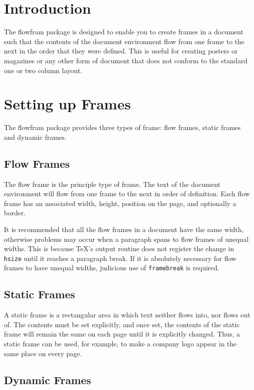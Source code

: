 \documentclass[a0]{a0poster}
\newcommand{\sty}[1]{\textsf{#1}}
\newcommand{\env}[1]{\textsf{#1}}
\newcommand{\cmdname}[1]{\texttt{\symbol{92}#1}}
\begin{document}
\section{Introduction}

The \sty{flowfram} package is designed to enable you to create
frames in a document such that the
contents of the \env{document} environment flow from one
frame to the next in the order that they were defined.
This is useful for creating posters
or magazines or any other form of document that does not
conform to the standard one or two column layout.

\section{Setting up Frames}

The \sty{flowfram} package provides three types of frame:
{flow frames}, {static
frames} and {dynamic frames}.

\subsection{Flow Frames}

The flow frame is the principle type of frame.
The text of the \env{document} environment will flow from
one frame to the next in order of definition. Each
flow frame has an associated width, height,
position on the page, and optionally a border.

It is recommended that all the flow frames in a document
have the same width, otherwise problems may occur
when a paragraph spans to flow frames of unequal
widths. This is because \TeX's output routine does not
register the change in \cmdname{hsize} until it reaches
a paragraph break. If it is absolutely necessary for
flow frames to have unequal widths, judicious use of
\cmdname{framebreak} is required.

\subsection{Static Frames}

A static frame is a rectangular area in which text neither
flows into, nor flows out of.  The contents must be set
explicitly, and once set, the contents of the static frame will
remain the same on each page until it is explicitly
changed.  Thus, a static frame can be used, for example, to make
a company logo appear in the same place on every page.

\subsection{Dynamic Frames}
\end{document}
